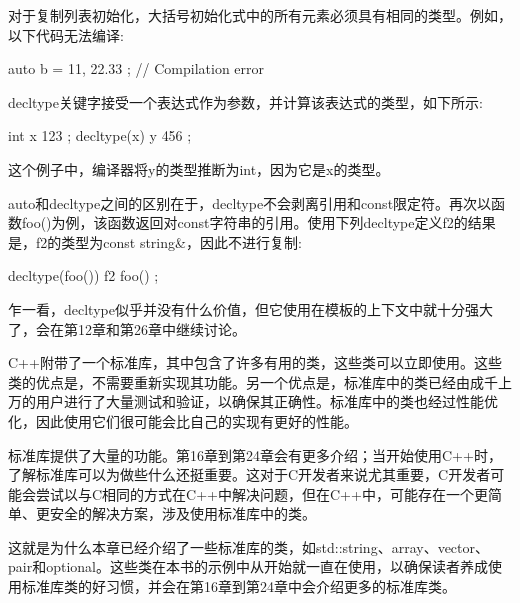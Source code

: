 对于复制列表初始化，大括号初始化式中的所有元素必须具有相同的类型。例如，以下代码无法编译:

\begin{cpp}
auto b = { 11, 22.33 }; // Compilation error
\end{cpp}


decltype关键字接受一个表达式作为参数，并计算该表达式的类型，如下所示:

\begin{cpp}
int x { 123 };
decltype(x) y { 456 };
\end{cpp}

这个例子中，编译器将y的类型推断为int，因为它是x的类型。

auto和decltype之间的区别在于，decltype不会剥离引用和const限定符。再次以函数foo()为例，该函数返回对const字符串的引用。使用下列decltype定义f2的结果是，f2的类型为const string\&，因此不进行复制:

\begin{cpp}
decltype(foo()) f2 { foo() };
\end{cpp}

乍一看，decltype似乎并没有什么价值，但它使用在模板的上下文中就十分强大了，会在第12章和第26章中继续讨论。


C++附带了一个标准库，其中包含了许多有用的类，这些类可以立即使用。这些类的优点是，不需要重新实现其功能。另一个优点是，标准库中的类已经由成千上万的用户进行了大量测试和验证，以确保其正确性。标准库中的类也经过性能优化，因此使用它们很可能会比自己的实现有更好的性能。

标准库提供了大量的功能。第16章到第24章会有更多介绍；当开始使用C++时，了解标准库可以为做些什么还挺重要。这对于C开发者来说尤其重要，C开发者可能会尝试以与C相同的方式在C++中解决问题，但在C++中，可能存在一个更简单、更安全的解决方案，涉及使用标准库中的类。

这就是为什么本章已经介绍了一些标准库的类，如std::string、array、vector、pair和optional。这些类在本书的示例中从开始就一直在使用，以确保读者养成使用标准库类的好习惯，并会在第16章到第24章中会介绍更多的标准库类。







